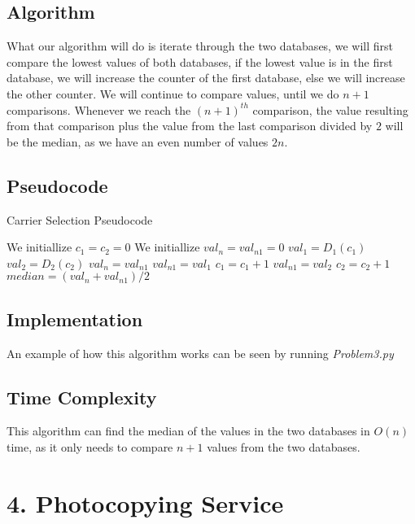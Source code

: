 \documentclass{article}
\begin{document}
\subsection*{Algorithm}

What our algorithm will do is iterate through the two databases, we will first compare the lowest values of both databases, if the lowest value is in the first database, we will increase the counter of the first database, else we will increase the other counter. We will continue to compare values, until we do $n+1$ comparisons. Whenever we reach the $(n+1)^{th}$ comparison, the value resulting from that comparison plus the value from the last comparison divided by $2$ will be the median, as we have an even number of values $2n$.

\subsection*{Pseudocode}

\begin{algorithm}[H]
\caption{Carrier Selection Pseudocode}
\begin{algorithmic}[1]
\State We initiallize $c_1 = c_2 = 0$
\State We initiallize $val_n = val_{n1} = 0$
 \State $val_1 = D_1(c_1)$
 \State $val_2 = D_2(c_2)$
 \State $val_n = val_{n1}$
  \State $val_{n1} = val_1$
  \State $c_1 = c_1 + 1$
 \Else
  \State $val_{n1} = val_2$
  \State $c_2 = c_2 + 1$
 \EndIf
\EndFor
\State \Return $median = (val_n+val_{n1})/2$
\end{algorithmic}
\end{algorithm}

\subsection*{Implementation}

An example of how this algorithm works can be seen by running \textit{Problem3.py}

\subsection*{Time Complexity}

This algorithm can find the median of the values in the two databases in $O(n)$ time, as it only needs to compare $n+1$ values from the two databases.

\section*{4. Photocopying Service}
\end{document}
